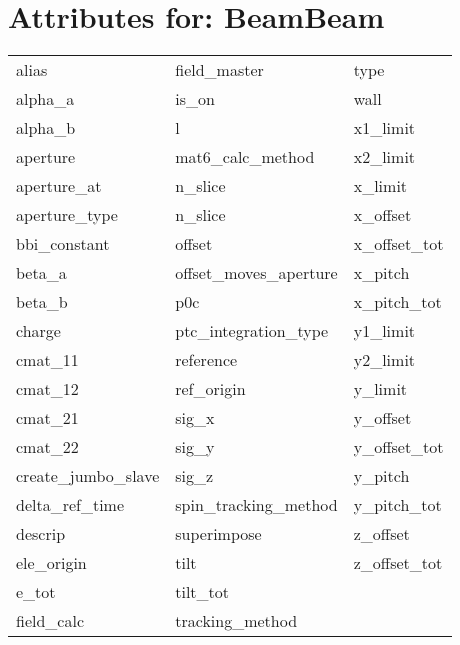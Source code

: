  \section{Attributes for: BeamBeam}
 \label{s:list.beambeam}
 
 \begin{tabular}{lll} \toprule
alias                       & field_master                & type                        \\
alpha_a                     & is_on                       & wall                        \\
alpha_b                     & l                           & x1_limit                    \\
aperture                    & mat6_calc_method            & x2_limit                    \\
aperture_at                 & n_slice                     & x_limit                     \\
aperture_type               & n_slice                     & x_offset                    \\
bbi_constant                & offset                      & x_offset_tot                \\
beta_a                      & offset_moves_aperture       & x_pitch                     \\
beta_b                      & p0c                         & x_pitch_tot                 \\
charge                      & ptc_integration_type        & y1_limit                    \\
cmat_11                     & reference                   & y2_limit                    \\
cmat_12                     & ref_origin                  & y_limit                     \\
cmat_21                     & sig_x                       & y_offset                    \\
cmat_22                     & sig_y                       & y_offset_tot                \\
create_jumbo_slave          & sig_z                       & y_pitch                     \\
delta_ref_time              & spin_tracking_method        & y_pitch_tot                 \\
descrip                     & superimpose                 & z_offset                    \\
ele_origin                  & tilt                        & z_offset_tot                \\
e_tot                       & tilt_tot                    &                             \\
field_calc                  & tracking_method             &                             \\
 \bottomrule
 \end{tabular}
 \vfill
 
